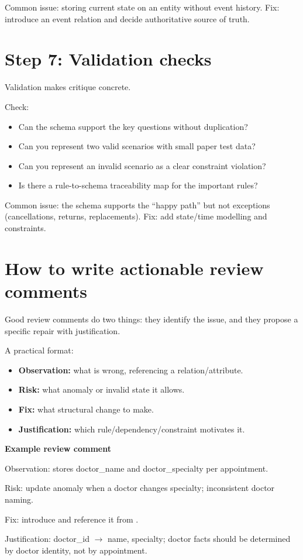 Common issue: storing current state on an entity without event history.
Fix: introduce an event relation and decide authoritative source of truth.

\section{Step 7: Validation checks}
Validation makes critique concrete.

Check:
\begin{itemize}[leftmargin=*,nosep]
  \item Can the schema support the key questions without duplication?
  \item Can you represent two valid scenarios with small paper test data?
  \item Can you represent an invalid scenario as a clear constraint violation?
  \item Is there a rule-to-schema traceability map for the important rules?
\end{itemize}

Common issue: the schema supports the “happy path” but not exceptions (cancellations, returns, replacements).
Fix: add state/time modelling and constraints.

\section{How to write actionable review comments}
Good review comments do two things:
they identify the issue, and they propose a specific repair with justification.

A practical format:
\begin{itemize}[leftmargin=*,nosep]
  \item \textbf{Observation:} what is wrong, referencing a relation/attribute.
  \item \textbf{Risk:} what anomaly or invalid state it allows.
  \item \textbf{Fix:} what structural change to make.
  \item \textbf{Justification:} which rule/dependency/constraint motivates it.
\end{itemize}

\begin{examplebox}
\textbf{Example review comment}\par\smallskip
Observation:  stores doctor\_name and doctor\_specialty per appointment.\par
Risk: update anomaly when a doctor changes specialty; inconsistent doctor naming.\par
Fix: introduce  and reference it from .\par
Justification: doctor\_id \(\rightarrow\) name, specialty; doctor facts should be determined by doctor identity, not by appointment.
\end{examplebox}

